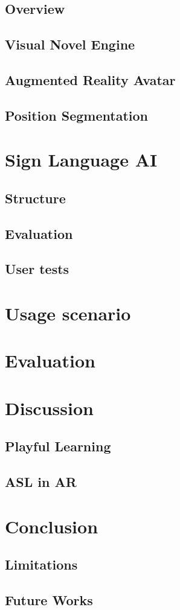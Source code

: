 \subsection{Overview}
\subsection{Visual Novel Engine}
\subsection{Augmented Reality Avatar}
\subsection{Position Segmentation}

\section{Sign Language AI}

\subsection{Structure}
\subsection{Evaluation}
\subsection{User tests}

\section{Usage scenario}

\section{Evaluation}

\section{Discussion}

\subsection{Playful Learning}
\subsection{ASL in AR}

\section{Conclusion}

\subsection{Limitations}
\subsection{Future Works}
